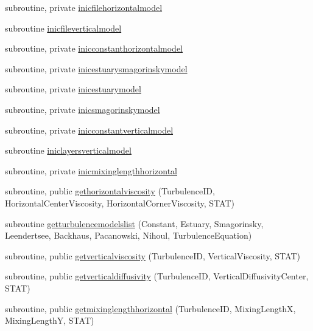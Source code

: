 \begin{DoxyCompactItemize}
\item 
subroutine, private \mbox{\hyperlink{namespacemoduleturbulence_af876648dc22afb9f49305a2d9c2f1be4}{inicfilehorizontalmodel}}
\item 
subroutine \mbox{\hyperlink{namespacemoduleturbulence_abccdbd06f5d7520144dadb5297887cfb}{inicfileverticalmodel}}
\item 
subroutine, private \mbox{\hyperlink{namespacemoduleturbulence_a1d7775ffdad42a39e0e66a78b56f8faf}{inicconstanthorizontalmodel}}
\item 
subroutine, private \mbox{\hyperlink{namespacemoduleturbulence_a7dcc612b541b2355f6ee7df80ef63634}{inicestuarysmagorinskymodel}}
\item 
subroutine, private \mbox{\hyperlink{namespacemoduleturbulence_ad65bc066b505edcac467325fc067aa87}{inicestuarymodel}}
\item 
subroutine, private \mbox{\hyperlink{namespacemoduleturbulence_a3ccb54fdbe649b382ed14de6135fd7b9}{inicsmagorinskymodel}}
\item 
subroutine, private \mbox{\hyperlink{namespacemoduleturbulence_a2cecb8eb2b3e94ef70af30650d368ef8}{inicconstantverticalmodel}}
\item 
subroutine \mbox{\hyperlink{namespacemoduleturbulence_af52d9bce4123a146f0b750fab46833ee}{iniclayersverticalmodel}}
\item 
subroutine, private \mbox{\hyperlink{namespacemoduleturbulence_af1c597f7f366a455e6e36dbc70ea56b6}{inicmixinglengthhorizontal}}
\item 
subroutine, public \mbox{\hyperlink{namespacemoduleturbulence_a37e3796794d913feea94c19ec07b14fb}{gethorizontalviscosity}} (Turbulence\+ID, Horizontal\+Center\+Viscosity, Horizontal\+Corner\+Viscosity, S\+T\+AT)
\item 
subroutine \mbox{\hyperlink{namespacemoduleturbulence_a7e2b5e220e823c62e0ceb84ca26e734b}{getturbulencemodelslist}} (Constant, Estuary, Smagorinsky, Leendertsee, Backhaus, Pacanowski, Nihoul, Turbulence\+Equation)
\item 
subroutine, public \mbox{\hyperlink{namespacemoduleturbulence_a2ef11327f7c8ee6d8580c79c1a68bbdc}{getverticalviscosity}} (Turbulence\+ID, Vertical\+Viscosity, S\+T\+AT)
\item 
subroutine, public \mbox{\hyperlink{namespacemoduleturbulence_a6067ede135e4137914b0f3958ddc0353}{getverticaldiffusivity}} (Turbulence\+ID, Vertical\+Diffusivity\+Center, S\+T\+AT)
\item 
subroutine, public \mbox{\hyperlink{namespacemoduleturbulence_ad3675f05df244e553dafe1a09eb8f7e1}{getmixinglengthhorizontal}} (Turbulence\+ID, Mixing\+LengthX, Mixing\+LengthY, S\+T\+AT)

\end{DoxyCompactItemize}
